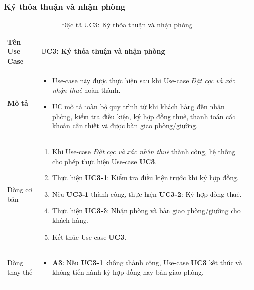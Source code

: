 \subsubsection{Ký thỏa thuận và nhận phòng}
\noindent
\begin{table}[H]
    \centering
\begin{tabularx}{\textwidth}{|>{\centering\arraybackslash\bfseries}m{3.5cm}|X|}
    \hline
    Tên Use Case & {\centering\textbf{UC3: Ký thỏa thuận và nhận phòng}\par} \\ 
    \hline

    Mô tả &
    \vspace{0.2cm}
    \begin{itemize}[leftmargin=*, nosep, label=-]
        \item Use-case này được thực hiện sau khi Use-case \textit{Đặt cọc và xác nhận thuê} hoàn thành.
        \item UC mô tả toàn bộ quy trình từ khi khách hàng đến nhận phòng, kiểm tra điều kiện, ký hợp đồng thuê, thanh toán các khoản cần thiết và được bàn giao phòng/giường.
    \end{itemize} \\ 
    \hline

    Dòng cơ bản &
    \vspace{0.2cm}
    \begin{enumerate}[leftmargin=*, nosep]
        \item Khi Use-case \textit{Đặt cọc và xác nhận thuê} thành công, hệ thống cho phép thực hiện Use-case \textbf{UC3}.
        \item Thực hiện \textbf{UC3-1}: Kiểm tra điều kiện trước khi ký hợp đồng.
        \item Nếu \textbf{UC3-1} thành công, thực hiện \textbf{UC3-2}: Ký hợp đồng thuê.
        \item Thực hiện \textbf{UC3-3}: Nhận phòng và bàn giao phòng/giường cho khách hàng.
        \item Kết thúc Use-case \textbf{UC3}.
    \end{enumerate} \\ 
    \hline

    Dòng thay thế &
    \vspace{0.2cm}
    \begin{itemize}[leftmargin=*, nosep, label=-]
        \item \textbf{A3:} Nếu \textbf{UC3-1} không thành công, Use-case \textbf{UC3} kết thúc và không tiến hành ký hợp đồng hay bàn giao phòng.
    \end{itemize} \\ 
    \hline
\end{tabularx}
\caption{Đặc tả UC3: Ký thỏa thuận và nhận phòng}
\end{table}

